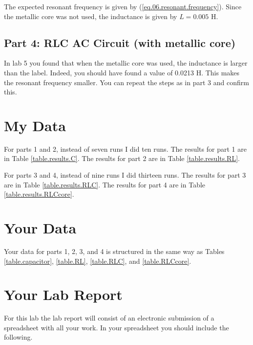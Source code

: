 The expected resonant frequency is given by (\ref{eq.06.resonant.frequency}). Since the metallic core was not used, the inductance is given by $L = 0.005$ H.
\subsection{Part 4: RLC AC Circuit (with metallic core)}
In lab 5 you found that when the metallic core was used, the inductance is larger than the label. Indeed, you should have found a value of 0.0213 H. This makes the resonant frequency smaller. You can repeat the steps as in part 3 and confirm this.
\section{My Data}
For parts 1 and 2, instead of seven runs I did ten runs. The results for part 1 are in Table \ref{table.results.C}. The results for part 2 are in Table \ref{table.results.RL}.

For parts 3 and 4, instead of nine runs I did thirteen runs. The results for part 3 are in Table \ref{table.results.RLC}. The results for part 4 are in Table \ref{table.results.RLCcore}.
\section{Your Data}
Your data for parts 1, 2, 3, and 4 is structured in the same way as Tables \ref{table.capacitor}, \ref{table.RL}, \ref{table.RLC}, and \ref{table.RLCcore}.
\pagebreak
\section{Your Lab Report}
For this lab the lab report will consist of an electronic submission of a spreadsheet with all your work. In your spreadsheet you should include the following.

